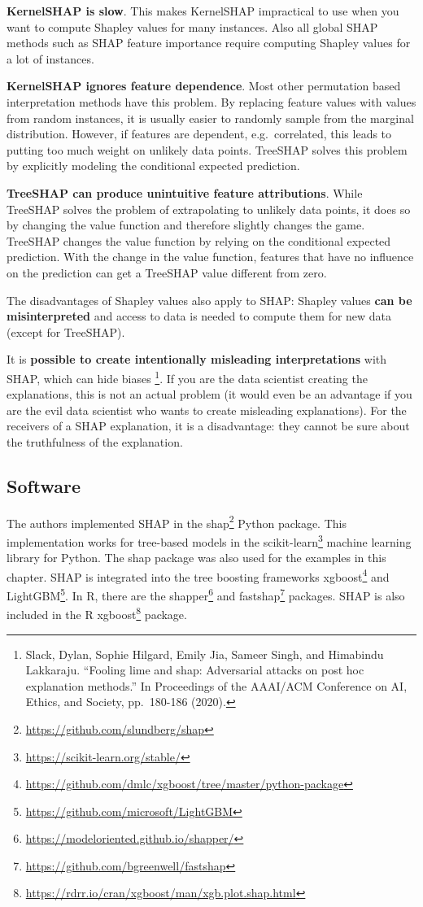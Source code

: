 \documentclass[
  10pt,
]{scrbook}
\renewcommand{\href}[2]{#2\footnote{\url{#1}}}
\begin{document}
\textbf{KernelSHAP is slow}.
This makes KernelSHAP impractical to use when you want to compute Shapley values for many instances.
Also all global SHAP methods such as SHAP feature importance require computing Shapley values for a lot of instances.

\textbf{KernelSHAP ignores feature dependence}.
Most other permutation based interpretation methods have this problem.
By replacing feature values with values from random instances, it is usually easier to randomly sample from the marginal distribution.
However, if features are dependent, e.g.~correlated, this leads to putting too much weight on unlikely data points.
TreeSHAP solves this problem by explicitly modeling the conditional expected prediction.

\textbf{TreeSHAP can produce unintuitive feature attributions}.
While TreeSHAP solves the problem of extrapolating to unlikely data points, it does so by changing the value function and therefore slightly changes the game.
TreeSHAP changes the value function by relying on the conditional expected prediction.
With the change in the value function, features that have no influence on the prediction can get a TreeSHAP value different from zero.

The disadvantages of Shapley values also apply to SHAP:
Shapley values \textbf{can be misinterpreted} and access to data is needed to compute them for new data (except for TreeSHAP).

It is \textbf{possible to create intentionally misleading interpretations} with SHAP, which can hide biases \footnote{Slack, Dylan, Sophie Hilgard, Emily Jia, Sameer Singh, and Himabindu Lakkaraju. ``Fooling lime and shap: Adversarial attacks on post hoc explanation methods.'' In Proceedings of the AAAI/ACM Conference on AI, Ethics, and Society, pp.~180-186 (2020).}.
If you are the data scientist creating the explanations, this is not an actual problem (it would even be an advantage if you are the evil data scientist who wants to create misleading explanations).
For the receivers of a SHAP explanation, it is a disadvantage: they cannot be sure about the truthfulness of the explanation.

\hypertarget{software-5}{%
\subsection{Software}\label{software-5}}

The authors implemented SHAP in the \href{https://github.com/slundberg/shap}{shap} Python package.
This implementation works for tree-based models in the \href{https://scikit-learn.org/stable/}{scikit-learn} machine learning library for Python.
The shap package was also used for the examples in this chapter.
SHAP is integrated into the tree boosting frameworks \href{https://github.com/dmlc/xgboost/tree/master/python-package}{xgboost} and \href{https://github.com/microsoft/LightGBM}{LightGBM}.
In R, there are the \href{https://modeloriented.github.io/shapper/}{shapper} and \href{https://github.com/bgreenwell/fastshap}{fastshap} packages.
SHAP is also included in the R \href{https://rdrr.io/cran/xgboost/man/xgb.plot.shap.html}{xgboost} package.
\end{document}
